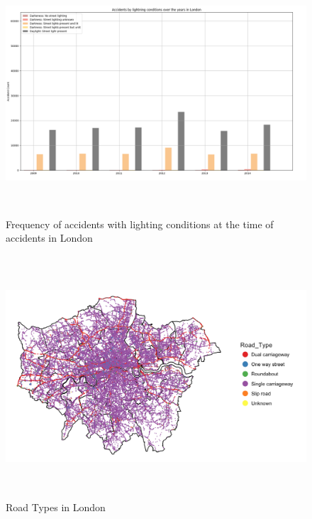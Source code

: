 \documentclass[a4paper, 11pt]{article}
\begin{document}
\begin{figure}[H]
    \begin{center}
      \includegraphics[height=9cm, width=20cm,keepaspectratio]{light-conditions-london.png}
      \caption{Frequency of accidents with lighting conditions at the time of accidents in London}
    \end{center}
\end{figure}

\begin{figure}[H]
    \begin{center}
      \includegraphics[height=9cm, scale=0.01,keepaspectratio]{london_roads.png}
      \caption{Road Types in London}
    \end{center}
\end{figure}
\end{document}

